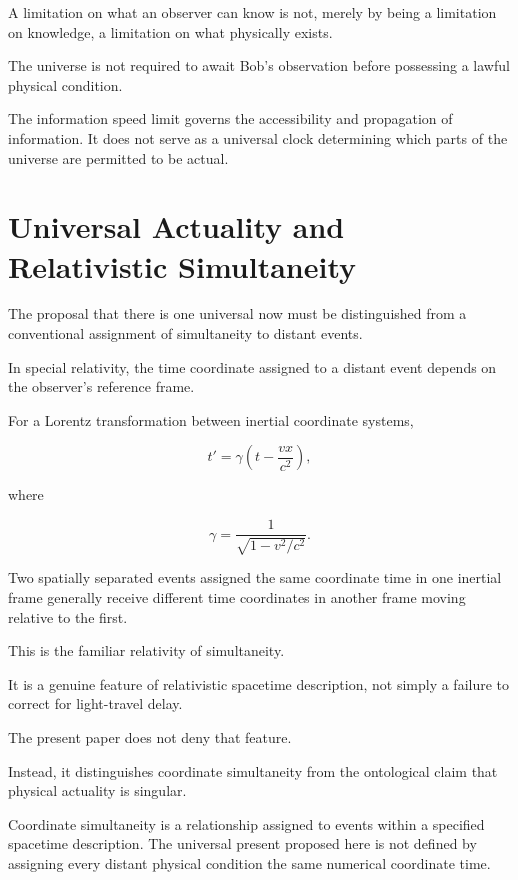 \documentclass[12pt,onecolumn]{article}
\begin{document}
A limitation on what an observer can know is not, merely by being a limitation on knowledge, a limitation on what physically exists.

The universe is not required to await Bob's observation before possessing a lawful physical condition.

The information speed limit governs the accessibility and propagation of information. It does not serve as a universal clock determining which parts of the universe are permitted to be actual.

\section{Universal Actuality and Relativistic Simultaneity}

The proposal that there is one universal now must be distinguished from a conventional assignment of simultaneity to distant events.

In special relativity, the time coordinate assigned to a distant event depends on the observer's reference frame.

For a Lorentz transformation between inertial coordinate systems,

\begin{equation}
t'=\gamma\left(t-\frac{vx}{c^2}\right),
\end{equation}

where

\begin{equation}
\gamma=\frac{1}{\sqrt{1-v^2/c^2}}.
\end{equation}

Two spatially separated events assigned the same coordinate time in one inertial frame generally receive different time coordinates in another frame moving relative to the first.

This is the familiar relativity of simultaneity.

It is a genuine feature of relativistic spacetime description, not simply a failure to correct for light-travel delay.

The present paper does not deny that feature.

Instead, it distinguishes coordinate simultaneity from the ontological claim that physical actuality is singular.

Coordinate simultaneity is a relationship assigned to events within a specified spacetime description. The universal present proposed here is not defined by assigning every distant physical condition the same numerical coordinate time.
\end{document}
